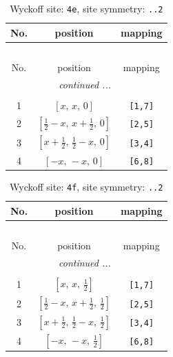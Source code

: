 \documentclass[fleqn,8pt]{jsarticle}
\begin{document}
\begin{longtable}{ccc}
\caption{Wyckoff site: {\tt 4e}, site symmetry: {\tt ..2}}
 \\
 \hline \hline
No. & position & mapping \\ \hline \endfirsthead

\multicolumn{2}{l}{\tablename\ \thetable{}} \\
 \hline \hline
No. & position & mapping \\ \hline \endhead

 \hline \hline
\multicolumn{2}{r}{\footnotesize\it continued ...} \\ \endfoot

 \hline \hline
\multicolumn{2}{r}{} \\ \endlastfoot

1 & $\left[ x,\, x,\, 0 \right]$ & {\tt [1,7]} \\ \hline
2 & $\left[ \frac{1}{2} - x,\, x + \frac{1}{2},\, 0 \right]$ & {\tt [2,5]} \\ \hline
3 & $\left[ x + \frac{1}{2},\, \frac{1}{2} - x,\, 0 \right]$ & {\tt [3,4]} \\ \hline
4 & $\left[ - x,\, - x,\, 0 \right]$ & {\tt [6,8]} \\
\end{longtable}
\renewcommand{\arraystretch}{1.2}
\begin{longtable}{ccc}
\caption{Wyckoff site: {\tt 4f}, site symmetry: {\tt ..2}}
 \\
 \hline \hline
No. & position & mapping \\ \hline \endfirsthead

\multicolumn{2}{l}{\tablename\ \thetable{}} \\
 \hline \hline
No. & position & mapping \\ \hline \endhead

 \hline \hline
\multicolumn{2}{r}{\footnotesize\it continued ...} \\ \endfoot

 \hline \hline
\multicolumn{2}{r}{} \\ \endlastfoot

1 & $\left[ x,\, x,\, \frac{1}{2} \right]$ & {\tt [1,7]} \\ \hline
2 & $\left[ \frac{1}{2} - x,\, x + \frac{1}{2},\, \frac{1}{2} \right]$ & {\tt [2,5]} \\ \hline
3 & $\left[ x + \frac{1}{2},\, \frac{1}{2} - x,\, \frac{1}{2} \right]$ & {\tt [3,4]} \\ \hline
4 & $\left[ - x,\, - x,\, \frac{1}{2} \right]$ & {\tt [6,8]} \\
\end{longtable}
\end{document}
